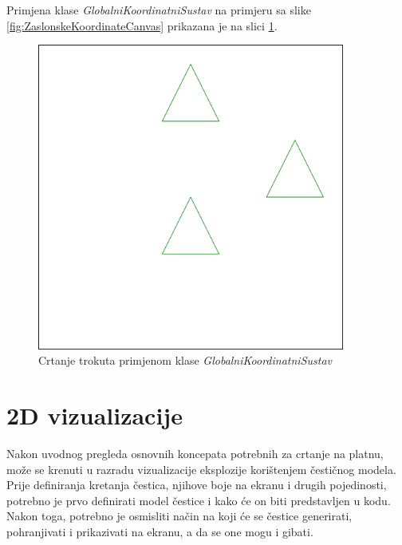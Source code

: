\documentclass{foi}
\begin{document}
Primjena klase \textit{GlobalniKoordinatniSustav} na primjeru sa slike \ref{fig:ZaslonskeKoordinateCanvas} prikazana je na slici \ref{fig:TransformiraniTrokutiCanvas}.

\begin{figure}[H]
    \centering
    \includegraphics[width=0.9\textwidth]{slike/8_TransformiraniTrokutiCanvas.png}
    \captionsetup{justification=centering}
    \caption{Crtanje trokuta primjenom klase \textit{GlobalniKoordinatniSustav}}
\label{fig:TransformiraniTrokutiCanvas}
\end{figure}

\chapter{2D vizualizacije}
Nakon uvodnog pregleda osnovnih koncepata potrebnih za crtanje na platnu, može se krenuti u razradu vizualizacije eksplozije korištenjem čestičnog modela. Prije definiranja kretanja čestica, njihove boje na ekranu i drugih pojedinosti, potrebno je prvo definirati model čestice i kako će on biti predstavljen u kodu. Nakon toga, potrebno je osmisliti način na koji će se čestice generirati, pohranjivati i prikazivati na ekranu, a da se one mogu i gibati. 
\end{document}
